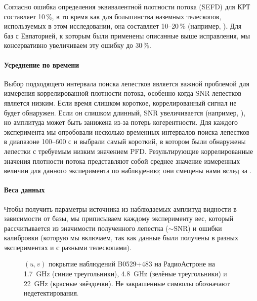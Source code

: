 Согласно \cite{Kovalev_2014_rus} ошибка определения эквивалентной плотности потока (SEFD) для КРТ
составляет 10\,\%, в то время как для большинства наземных телескопов, используемых в этом
исследовании, она составляет 10--20\,\% (например, \cite{Bondi_1994}). Для баз с Евпаторией, к
которым были применены описанные выше исправления, мы консервативно увеличиваем эту ошибку до
30\,\%.

\paragraph{Усреднение по времени}

Выбор подходящего интервала поиска лепестков является важной проблемой для измерения
коррелированной плотности потока, особенно когда SNR лепестков является низким. Если время слишком
короткое, коррелированный сигнал не будет обнаружен. Если он слишком длинный, SNR увеличивается
(например, \cite{Clark_1968}), но амплитуда может быть занижена из-за потерь когерентности. Для
каждого эксперимента мы опробовали несколько временных интервалов поиска лепестков в диапазоне
100--600 с и выбрали самый короткий, в котором были обнаружены лепестки с требуемым низким значением
PFD. Результирующие коррелированные значения плотности потока представляют собой среднее значение
измеренных величин для данного эксперимента по наблюдению; они смещены нами вслед за
\cite{VLBIbook}.

\paragraph{Веса данных}

Чтобы получить параметры источника из наблюдаемых амплитуд видности в зависимости от базы, мы
приписываем каждому эксперименту вес, который рассчитывается из значимости полученного лепестка
($\sim$SNR) и ошибки калибровки (которую мы включаем, так как данные были получены в разных
экспериментах и с разными телескопами).

\begin{figure}[]
\caption{$(u, v)$ покрытие наблюдений B0529+483 на РадиоАстроне на \SI{1.7}{\GHz} (синие
треугольники), \SI{4.8}{\GHz} (зелёные треугольники) и \SI{22}{\GHz} (красные звёздочки).
Не закрашенные символы обозначают недетектирования.}
\label{fig:0529_uv}
\end{figure}

